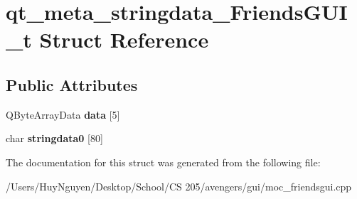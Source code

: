 \hypertarget{structqt__meta__stringdata__FriendsGUI__t}{}\section{qt\+\_\+meta\+\_\+stringdata\+\_\+\+Friends\+G\+U\+I\+\_\+t Struct Reference}
\label{structqt__meta__stringdata__FriendsGUI__t}
\subsection*{Public Attributes}
\begin{DoxyCompactItemize}
\item 
Q\+Byte\+Array\+Data {\bfseries data} \mbox{[}5\mbox{]}\hypertarget{structqt__meta__stringdata__FriendsGUI__t_a76e8845632989861b06a8abba8008a71}{}\label{structqt__meta__stringdata__FriendsGUI__t_a76e8845632989861b06a8abba8008a71}

\item 
char {\bfseries stringdata0} \mbox{[}80\mbox{]}\hypertarget{structqt__meta__stringdata__FriendsGUI__t_a98d33fdfd74ee98bf94699923c1dd295}{}\label{structqt__meta__stringdata__FriendsGUI__t_a98d33fdfd74ee98bf94699923c1dd295}

\end{DoxyCompactItemize}


The documentation for this struct was generated from the following file\+:\begin{DoxyCompactItemize}
\item 
/\+Users/\+Huy\+Nguyen/\+Desktop/\+School/\+C\+S 205/avengers/gui/moc\+\_\+friendsgui.\+cpp\end{DoxyCompactItemize}
